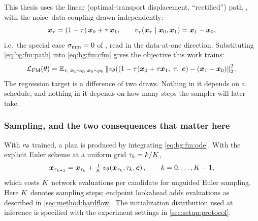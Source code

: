This thesis uses the linear (optimal-transport displacement, ``rectified'')
path \parencite{lipman2023flow,liu2023flow}, with the noise--data coupling drawn independently:
\begin{equation}\label{eq:bg:fm:path}
  \boldsymbol{x}_{\tau} = (1-\tau)\,\boldsymbol{x}_{0} + \tau\,\boldsymbol{x}_{1},
  \qquad
  v_{\tau}(\boldsymbol{x}_{\tau}\mid \boldsymbol{x}_{0},\boldsymbol{x}_{1}) = \boldsymbol{x}_{1} - \boldsymbol{x}_{0},
\end{equation}
i.e.\ the special case $\sigma_{\textrm{min}} = 0$ of \parencite[Eq.~(20)--(23)]{lipman2023flow}, read in
the data-at-one direction. Substituting \eqref{eq:bg:fm:path} into \eqref{eq:bg:fm:cfm} gives
the objective this work trains:
\begin{equation}\label{eq:bg:fm:loss}
  \mathcal{L}_{\textrm{FM}}(\theta)
  = \mathbb{E}_{\tau,\;\boldsymbol{x}_{1}\sim q,\;\boldsymbol{x}_{0}\sim p_{0}}
    \left\|v_{\theta}\!\left((1-\tau)\boldsymbol{x}_{0} + \tau\boldsymbol{x}_{1},\;\tau,\;\boldsymbol{c}\right)
      - \left(\boldsymbol{x}_{1}-\boldsymbol{x}_{0}\right)\right\|_{2}^{2}.
\end{equation}
The regression target is a difference of two draws. Nothing in it depends on a schedule, and
nothing in it depends on how many steps the sampler will later take.

\subsubsection*{Sampling, and the two consequences that matter here}

With $v_{\theta}$ trained, a plan is produced by integrating \eqref{eq:bg:fm:ode}. With
the explicit Euler scheme at a uniform grid $\tau_{k} = k/K$,
\begin{equation}\label{eq:bg:fm:euler}
  \boldsymbol{x}_{\tau_{k+1}} = \boldsymbol{x}_{\tau_{k}}
    + \tfrac{1}{K}\,v_{\theta}\!\left(\boldsymbol{x}_{\tau_{k}},\tau_{k},\boldsymbol{c}\right),
  \qquad k = 0,\dots,K-1,
\end{equation}
which costs $K$ network evaluations per candidate for unguided Euler sampling. Here $K$
denotes sampling steps; endpoint lookahead adds evaluations as described in
\autoref{sec:method:hardflow}. The initialization distribution used at inference is specified with
the experiment settings in \autoref{sec:setup:protocol}.

